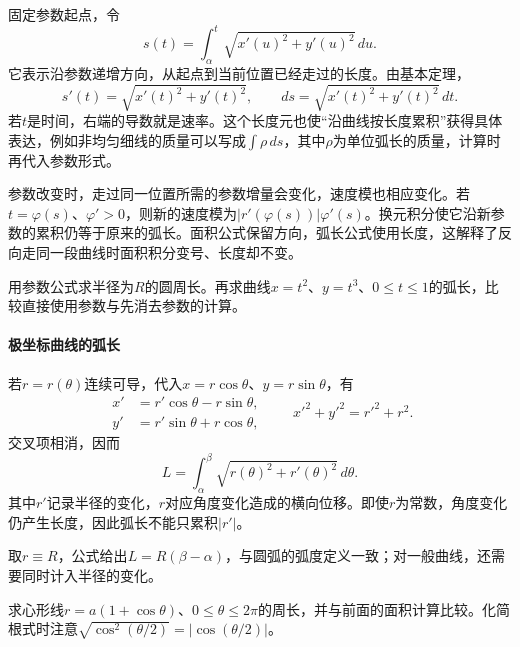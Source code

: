 固定参数起点，令
\begin{equation*}
 s(t)=\int_\alpha^t\sqrt{x'(u)^2+y'(u)^2}\,du.
\end{equation*}
它表示沿参数递增方向，从起点到当前位置已经走过的长度。由基本定理，
\begin{equation*}
 s'(t)=\sqrt{x'(t)^2+y'(t)^2},\qquad
 ds=\sqrt{x'(t)^2+y'(t)^2}\,dt.
\end{equation*}
若\(t\)是时间，右端的导数就是速率。这个长度元也使“沿曲线按长度累积”获得具体表达，例如非均匀细线的质量可以写成\(\int\rho\,ds\)，其中\(\rho\)为单位弧长的质量，计算时再代入参数形式。

参数改变时，走过同一位置所需的参数增量会变化，速度模也相应变化。若\(t=\varphi(s)\)、\(\varphi'>0\)，则新的速度模为\(|r'(\varphi(s))|\varphi'(s)\)。换元积分使它沿新参数的累积仍等于原来的弧长。面积公式保留方向，弧长公式使用长度，这解释了反向走同一段曲线时面积积分变号、长度却不变。

\begin{example}
用参数公式求半径为\(R\)的圆周长。再求曲线\(x=t^2\)、\(y=t^3\)、\(0\le t\le1\)的弧长，比较直接使用参数与先消去参数的计算。
\end{example}

\paragraph{极坐标曲线的弧长} \mbox{}

若\(r=r(\theta)\)连续可导，代入\(x=r\cos\theta\)、\(y=r\sin\theta\)，有
\begin{equation*}
 \begin{aligned}
 x'&=r'\cos\theta-r\sin\theta,\\
 y'&=r'\sin\theta+r\cos\theta,
 \end{aligned}
 \qquad x'^2+y'^2=r'^2+r^2.
\end{equation*}
交叉项相消，因而
\begin{equation}\label{eq:calculus-polar-arc-length}
 L=\int_\alpha^\beta\sqrt{r(\theta)^2+r'(\theta)^2}\,d\theta.
\end{equation}
其中\(r'\)记录半径的变化，\(r\)对应角度变化造成的横向位移。即使\(r\)为常数，角度变化仍产生长度，因此弧长不能只累积\(|r'|\)。

取\(r\equiv R\)，公式给出\(L=R(\beta-\alpha)\)，与圆弧的弧度定义一致；对一般曲线，还需要同时计入半径的变化。

\begin{example}
求心形线\(r=a(1+\cos\theta)\)、\(0\le\theta\le2\pi\)的周长，并与前面的面积计算比较。化简根式时注意\(\sqrt{\cos^2(\theta/2)}=|\cos(\theta/2)|\)。
\end{example}

